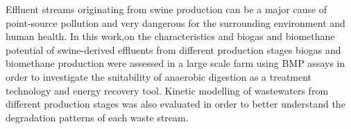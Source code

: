 Effluent streams originating from swine production can be a major cause of point-source pollution and very dangerous for the surrounding environment and human health. In this work,on the characteristics and  biogas and biomethane potential of swine-derived effluents from different production stages biogas and biomethane production were assessed in a large scale farm using BMP assays in order to investigate the suitability of anaerobic digestion as a treatment technology and energy recovery tool. Kinetic modelling of wastewaters from different production stages was also evaluated in order to better understand the degradation patterns of each waste stream.